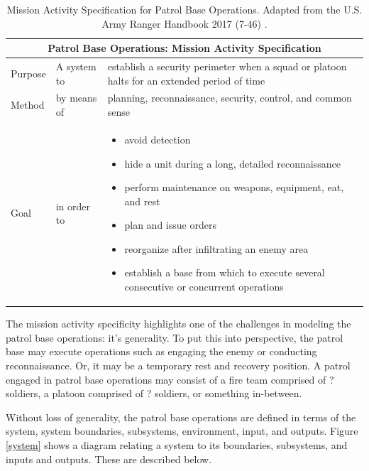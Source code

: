 \documentclass[../../main/main.tex]{subfiles}
\begin{document}
\parskip=8pt
\begin{table}[h!]
\begin{center}
\begin{tabular}{ | m{3.3em} | m{3.8cm}| m{9cm} | } 
\hline
\multicolumn{3}{|c|}{Patrol Base Operations: Mission Activity Specification} \\
\hline \hline
Purpose & A system to & establish a security perimeter when a squad or platoon halts for an extended period of time \\ 
\hline
Method & by means of  & planning, reconnaissance, security, control, and common sense  \\ 
\hline
Goal & in order to & 
\begin{itemize}
\item avoid detection
\item hide a unit during a long, detailed reconnaissance
\item perform maintenance on weapons, equipment, eat, and rest
\item plan and issue orders
\item reorganize after infiltrating an enemy area
\item establish a base from which to execute several consecutive or concurrent operations
\end{itemize}
\\ 
\hline
\end{tabular}
\end{center}
\caption{Mission Activity Specification for Patrol Base Operations.  Adapted from the U.S. Army Ranger Handbook 2017 (7-46) \cite{rangermanual}.}
\label{pbtab}
\end{table}
\parskip=18pt

The mission activity specificity highlights one of the challenges in modeling the patrol base operations: it's generality.  To put this into perspective, the patrol base may execute operations such as engaging the enemy or conducting reconnaissance.  Or, it may be a temporary rest and recovery position.  A patrol engaged in patrol base operations may consist of a fire team comprised of ? soldiers, a platoon comprised of ? soldiers, or something in-between. 

Without loss of generality, the patrol base operations are defined in terms of the system, system boundaries, subsystems, environment, input, and outputs.  Figure \ref{system} shows a diagram relating a system to its boundaries, subsystems, and inputs and outputs.  These are described below.
\end{document}
